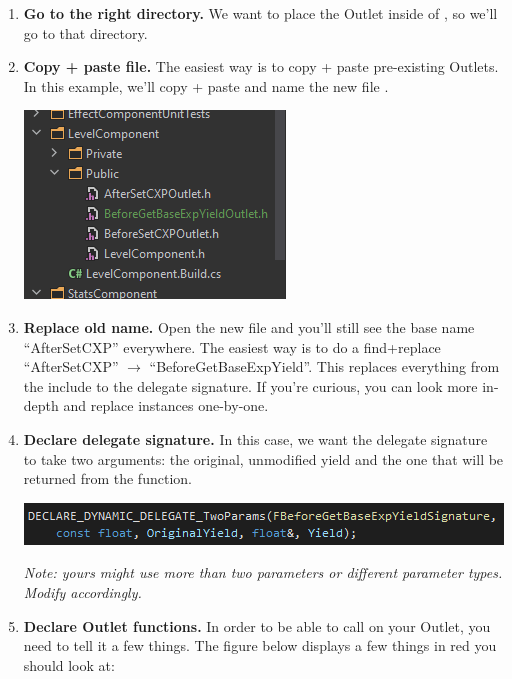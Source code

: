\begin{enumerate}
	\item{\textbf{Go to the right directory.} We want to place the Outlet inside of , so we'll go to that directory.}
	\item{\textbf{Copy + paste file.} The easiest way is to copy + paste pre-existing Outlets. In this example, we'll copy + paste  and name the new file . \\
	\begin{center}
		\includegraphics[scale=\ScreenshotScale]{create-outlet-rename}
	\end{center}
	}
	\item{\textbf{Replace old name.} Open the new file and you'll still see the base name ``AfterSetCXP'' everywhere. The easiest way is to do a find+replace ``AfterSetCXP'' $\rightarrow$ ``BeforeGetBaseExpYield''. This replaces everything from the  include to the delegate signature. If you're curious, you can look more in-depth and replace instances one-by-one.}
	\item{\textbf{Declare delegate signature.} In this case, we want the delegate signature to take two arguments: the original, unmodified yield and the one that will be returned from the  function.\\
	\begin{center}
		\includegraphics[scale=\ScreenshotScale]{create-outlet-signature}
	\end{center}
	\textit{Note: yours might use more than two parameters or different parameter types. Modify accordingly.}
	}
	\item{\textbf{Declare Outlet functions.} In order to be able to call  on your Outlet, you need to tell it a few things. The figure below displays a few things in red you should look at:\\
}
\end{enumerate}
